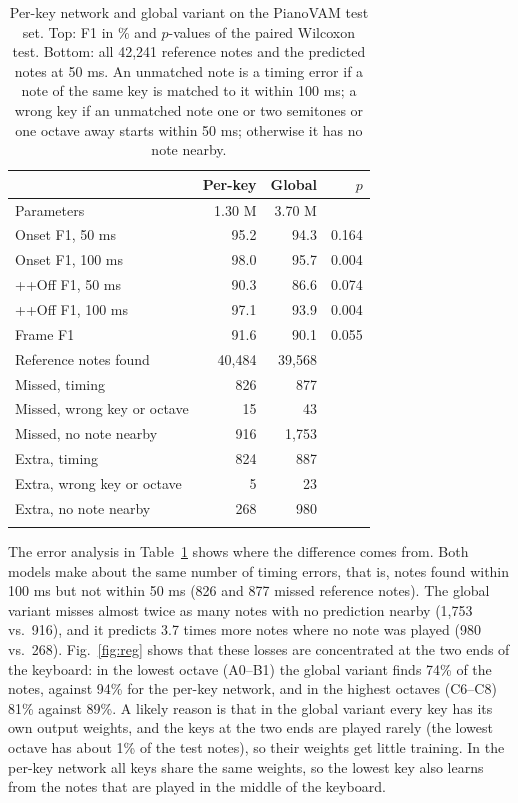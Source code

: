 \documentclass[pdflatex,sn-mathphys-num]{sn-jnl}
\begin{document}
\begin{table}[h]
\caption{Per-key network and global variant on the PianoVAM test set. Top: F1 in \% and $p$-values of the paired Wilcoxon test. Bottom: all 42,241 reference notes and the predicted notes at 50 ms. An unmatched note is a timing error if a note of the same key is matched to it within 100 ms; a wrong key if an unmatched note one or two semitones or one octave away starts within 50 ms; otherwise it has no note nearby.}\label{tab:abl}
\begin{tabular}{@{}lrrr@{}}
\toprule
 & Per-key & Global & $p$ \\
\midrule
Parameters & 1.30 M & 3.70 M & \\
Onset F1, 50 ms & 95.2 & 94.3 & 0.164 \\
Onset F1, 100 ms & 98.0 & 95.7 & 0.004 \\
++Off F1, 50 ms & 90.3 & 86.6 & 0.074 \\
++Off F1, 100 ms & 97.1 & 93.9 & 0.004 \\
Frame F1 & 91.6 & 90.1 & 0.055 \\
\midrule
Reference notes found & 40,484 & 39,568 & \\
Missed, timing & 826 & 877 & \\
Missed, wrong key or octave & 15 & 43 & \\
Missed, no note nearby & 916 & 1,753 & \\
Extra, timing & 824 & 887 & \\
Extra, wrong key or octave & 5 & 23 & \\
Extra, no note nearby & 268 & 980 & \\
\botrule
\end{tabular}
\end{table}

The error analysis in Table~\ref{tab:abl} shows where the difference comes from. Both models make about the same number of timing errors, that is, notes found within 100 ms but not within 50 ms (826 and 877 missed reference notes). The global variant misses almost twice as many notes with no prediction nearby (1,753 vs.\ 916), and it predicts 3.7 times more notes where no note was played (980 vs.\ 268). Fig.~\ref{fig:reg} shows that these losses are concentrated at the two ends of the keyboard: in the lowest octave (A0--B1) the global variant finds 74\% of the notes, against 94\% for the per-key network, and in the highest octaves (C6--C8) 81\% against 89\%. A likely reason is that in the global variant every key has its own output weights, and the keys at the two ends are played rarely (the lowest octave has about 1\% of the test notes), so their weights get little training. In the per-key network all keys share the same weights, so the lowest key also learns from the notes that are played in the middle of the keyboard.
\end{document}

